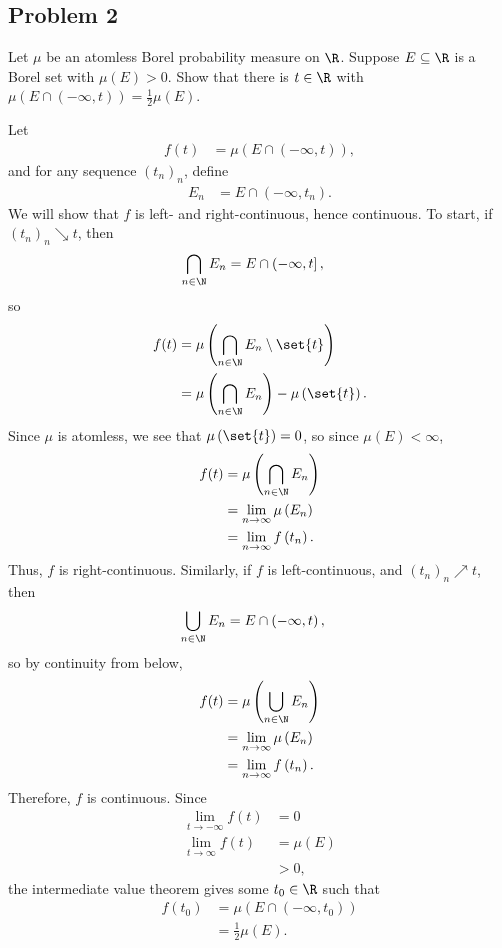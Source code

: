 \documentclass[10pt]{mypackage}
\begin{document}
\subsection{Problem 2}%
\begin{problem}
  Let $\mu$ be an atomless Borel probability measure on $\R$. Suppose $E\subseteq \R$ is a Borel set with $\mu\left( E \right) > 0$. Show that there is $t\in \R$ with $\mu\left( E\cap \left( -\infty,t \right) \right) = \frac{1}{2}\mu\left( E \right)$.
\end{problem}
Let
\begin{align*}
  f(t) &= \mu\left( E\cap \left( -\infty,t \right) \right),
\end{align*}
and for any sequence $\left( t_n \right)_n$, define
\begin{align*}
  E_n &= E\cap \left( -\infty,t_n \right).
\end{align*}
We will show that $f$ is left- and right-continuous, hence continuous. To start, if $\left( t_n \right)_n\searrow t$, then
\begin{align*}
  \bigcap_{n\in \N} E_n &= E\cap \left( -\infty,t \right],
\end{align*}
so
\begin{align*}
  f(t) &= \mu\left( \bigcap_{n\in \N} E_n\setminus \set{t} \right)\\
       &= \mu\left( \bigcap_{n\in \N} E_n \right) -\mu\left( \set{t} \right).
\end{align*}
Since $\mu$ is atomless, we see that $\mu\left( \set{t} \right) = 0$, so since $\mu\left( E \right) < \infty$,
\begin{align*}
  f(t) &= \mu\left( \bigcap_{n\in\N} E_n \right)\\
       &= \lim_{n\rightarrow\infty} \mu\left( E_n \right)\\
       &= \lim_{n\rightarrow\infty} f\left( t_n \right).
\end{align*}
Thus, $f$ is right-continuous. Similarly, if $f$ is left-continuous, and $\left( t_n \right)_n \nearrow t$, then
\begin{align*}
  \bigcup_{n\in \N} E_n &= E\cap \left( -\infty,t \right),
\end{align*}
so by continuity from below,
\begin{align*}
  f(t) &= \mu\left( \bigcup_{n\in\N} E_n \right)\\
       &= \lim_{n\rightarrow\infty} \mu\left( E_n \right)\\
       &= \lim_{n\rightarrow\infty} f\left( t_n \right).
\end{align*}
Therefore, $f$ is continuous. Since
\begin{align*}
  \lim_{t\rightarrow -\infty} f(t) &= 0\\
  \lim_{t\rightarrow\infty} f(t) &= \mu\left( E \right)\\
                                 &> 0,
\end{align*}
the intermediate value theorem gives some $t_0\in \R$ such that
\begin{align*}
  f\left(t_0\right) &= \mu\left( E\cap \left( -\infty,t_0 \right) \right)\\
                    &= \frac{1}{2}\mu\left( E \right).
\end{align*}
\end{document}
